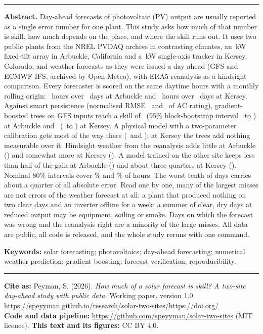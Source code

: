\documentclass[11pt]{article}
\newcommand{\paperversion}{1.0}
\newcommand{\doiref}{\ifx\paperdoi\empty\url{https://speyyman.github.io/research/solar-two-sites/}\else\href{https://doi.org/\paperdoi}{https://doi.org/\paperdoi}\fi}
\begin{document}
\vspace{1.2em}
\noindent\rule{\textwidth}{0.4pt}
{\small
\noindent\textbf{Abstract.} Day-ahead forecasts of photovoltaic (PV) output are usually reported as a single error number for one plant. This study asks how much of that number is skill, how much depends on the place, and where the skill runs out. It uses two public plants from the NREL PVDAQ archive in contrasting climates, an \ArbDcKw\,kW fixed-tilt array in Arbuckle, California and a \KerDcKw\,kW single-axis tracker in Kersey, Colorado, and weather forecasts as they were issued a day ahead (GFS and ECMWF IFS, archived by Open-Meteo), with ERA5 reanalysis as a hindsight comparison. Every forecaster is scored on the same daytime hours with a monthly rolling origin: \ArbHours\ hours over \ArbDays\ days at Arbuckle and \KerHours\ hours over \KerDays\ days at Kersey. Against smart persistence (normalised RMSE \ArbSmartNrmse\ and \KerSmartNrmse\ of AC rating), gradient-boosted trees on GFS inputs reach a skill of \ArbGbmSkill\ (95\% block-bootstrap interval \ArbGbmLo\ to \ArbGbmHi) at Arbuckle and \KerGbmSkill\ (\KerGbmLo\ to \KerGbmHi) at Kersey. A physical model with a two-parameter calibration gets most of the way there (\ArbPhysCalSkill\ and \KerPhysCalSkill); at Kersey the trees add nothing measurable over it. Hindsight weather from the reanalysis adds little at Arbuckle (\ArbGbmEraSkill) and somewhat more at Kersey (\KerGbmEraSkill). A model trained on the other site keeps less than half of the gain at Arbuckle (\ArbTransferSkill) and about three quarters at Kersey (\KerTransferSkill). Nominal 80\% intervals cover \ArbCovGfs\% and \KerCovGfs\% of hours. The worst tenth of days carries about a quarter of all absolute error. Read one by one, many of the largest misses are not errors of the weather forecast at all: a plant that produced nothing on two clear days and an inverter offline for a week; a summer of clear, dry days at reduced output may be equipment, soiling or smoke. Days on which the forecast was wrong and the reanalysis right are a minority of the large misses. All data are public, all code is released, and the whole study reruns with one command.

\smallskip
\noindent\textbf{Keywords:} solar forecasting; photovoltaics; day-ahead forecasting; numerical weather prediction; gradient boosting; forecast verification; reproducibility.\par}
\noindent\rule{\textwidth}{0.4pt}

{\footnotesize\noindent
\textbf{Cite as:} Peyman, S. (2026). \emph{How much of a solar forecast is skill? A two-site day-ahead study with public data.} Working paper, version \paperversion. \doiref\\
\textbf{Code and data pipeline:} \url{https://github.com/speyyman/solar-two-sites} (MIT licence). \textbf{This text and its figures:} CC BY 4.0.\par}
\end{document}
